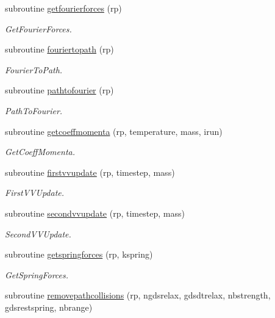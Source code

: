 \begin{DoxyCompactItemize}
subroutine \mbox{\hyperlink{namespacerpath_a17575cd0e216ffd99d188bb982fd2efc}{getfourierforces}} (rp)
\begin{DoxyCompactList}\small\item\em Get\+Fourier\+Forces. \end{DoxyCompactList}\item 
subroutine \mbox{\hyperlink{namespacerpath_a8808a2a9ef2cd749de76ec66e662cf4c}{fouriertopath}} (rp)
\begin{DoxyCompactList}\small\item\em Fourier\+To\+Path. \end{DoxyCompactList}\item 
subroutine \mbox{\hyperlink{namespacerpath_a58f6e30e1af43edf4aa86279c520213f}{pathtofourier}} (rp)
\begin{DoxyCompactList}\small\item\em Path\+To\+Fourier. \end{DoxyCompactList}\item 
subroutine \mbox{\hyperlink{namespacerpath_aa76074b978980fcf3419586f037a4385}{getcoeffmomenta}} (rp, temperature, mass, irun)
\begin{DoxyCompactList}\small\item\em Get\+Coeff\+Momenta. \end{DoxyCompactList}\item 
subroutine \mbox{\hyperlink{namespacerpath_a7fee98f4bae0eeddfeb9c7a7a0cd36de}{firstvvupdate}} (rp, timestep, mass)
\begin{DoxyCompactList}\small\item\em First\+V\+V\+Update. \end{DoxyCompactList}\item 
subroutine \mbox{\hyperlink{namespacerpath_ac85f7c72e6a51be0d86bde43398f5d1b}{secondvvupdate}} (rp, timestep, mass)
\begin{DoxyCompactList}\small\item\em Second\+V\+V\+Update. \end{DoxyCompactList}\item 
subroutine \mbox{\hyperlink{namespacerpath_ae05b8e955144357569094f22cb55b245}{getspringforces}} (rp, kspring)
\begin{DoxyCompactList}\small\item\em Get\+Spring\+Forces. \end{DoxyCompactList}\item 
subroutine \mbox{\hyperlink{namespacerpath_a89297ca90bf4171b4d1ac5a941e80a50}{removepathcollisions}} (rp, ngdsrelax, gdsdtrelax, nbstrength, gdsrestspring, nbrange)

\end{DoxyCompactItemize}
